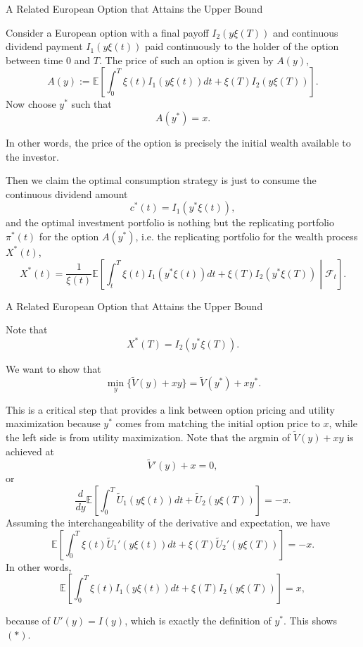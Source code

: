 \documentclass{beamer}
\begin{document}
\begin{frame}{A Related European Option that Attains the Upper Bound}

    {\footnotesize \footnotesize
      Consider a European option with a final payoff \( I_2(y\xi(T)) \) and continuous dividend payment \( I_1(y\xi(t)) \) paid continuously to the holder of the option between time 0 and \( T \). The price of such an option is given by \( A(y) \),
    \[
    A(y) := \mathbb{E} \left[ \int_{0}^{T} \xi(t)I_1(y\xi(t))dt + \xi(T)I_2(y\xi(T)) \right].
    \]
    Now choose \( y^* \) such that
    \[
    A(y^*) = x.  
    \]
    \par  \pause In other words, the price of the option is precisely the initial wealth available to the investor.
    \vspace{1em}
    \par Then we claim the optimal consumption strategy is just to consume the continuous dividend amount
\[
c^*(t) = I_1(y^*\xi(t)),
\]
and the optimal investment portfolio is nothing but the replicating portfolio \(\pi^*(t)\) for the option \(A(y^*)\), i.e. the replicating portfolio for the wealth process \(X^*(t)\),
\[
X^*(t) = \frac{1}{\xi(t)} \mathbb{E} \left[ \int_t^T \xi(t)I_1(y^*\xi(t))dt + \xi(T)I_2(y^*\xi(T)) \middle| \mathcal{F}_t \right].
\]

    }
\end{frame}

\begin{frame}{A Related European Option that Attains the Upper Bound}

    {\footnotesize \footnotesize
     Note that
     \vspace{-1em}
\[
X^*(T) = I_2(y^*\xi(T)).
\]

We want to show that
\[
\min_y \{\tilde{V}(y) + xy\} = \tilde{V}(y^*) + xy^*. \tag{*}
\]

This is a critical step that provides a link between option pricing and utility maximization because \(y^*\) comes from matching the initial option price to \(x\), while the left side is from utility maximization. Note that the argmin of \(\tilde{V}(y) + xy\) is achieved at
\[
\tilde{V}'(y) + x = 0,
\]
\vspace{-1em}
or
\[
\frac{d}{dy} \mathbb{E} \left[ \int_0^T \tilde{U}_1(y\xi(t))dt + \tilde{U}_2(y\xi(T)) \right] = -x.
\]
 \pause Assuming the interchangeability of the derivative and expectation, we have
\[
\mathbb{E} \left[ \int_0^T \xi(t)\tilde{U}_1'(y\xi(t))dt + \xi(T)\tilde{U}_2'(y\xi(T)) \right] = -x.
\]
  In other words,
\[
\mathbb{E} \left[ \int_0^T \xi(t)I_1(y\xi(t))dt + \xi(T)I_2(y\xi(T)) \right] = x,
\]
\par because of $U'(y)= I(y)$, which is exactly the definition of \( y^* \). This shows $(*)$.
    }
\end{frame}
\end{document}
